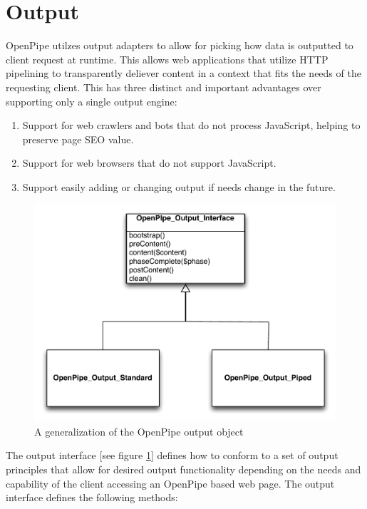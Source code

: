 \documentclass[12pt]{report}
\begin{document}
\section{Output}

OpenPipe utilzes output adapters to allow for picking how data is outputted to client request at runtime. This allows web applications that utilize HTTP pipelining to transparently deliever content in a context that fits the needs of the requesting client. This has three distinct and important advantages over supporting only a single output engine:

\begin{enumerate}
	\item Support for web crawlers and bots that do not process JavaScript, helping to preserve page SEO value.
	\item Support for web browsers that do not support JavaScript.
	\item Support easily adding or changing output if needs change in the future.
\end{enumerate}


\begin{figure}[H]
\label{fig:generalizationOutput}
\centering
\includegraphics[width=\textwidth,keepaspectratio]{figures/images/generalization_output.pdf}
\caption{A generalization of the OpenPipe output object}
\end{figure}

The output interface [see figure \ref{fig:generalizationOutput}] defines how to conform to a set of output principles that allow for desired output functionality depending on the needs and capability of the client accessing an OpenPipe based web page.  The output interface defines the following methods:
\end{document}
